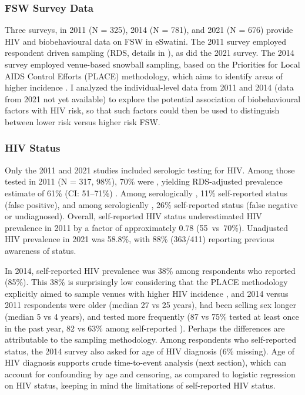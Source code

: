 \subsubsection{FSW Survey Data}\label{model.par.fsw.data}
Three surveys, in
2011 \cite{Baral2014} (N = 325),
2014 \cite{EswKP2014} (N = 781), and
2021 \cite{EswIBBS2022} (N = 676)
provide HIV and biobehavioural data on FSW in eSwatini.
The 2011 survey employed respondent driven sampling (RDS, details in \cite{Yam2013}),
as did the 2021 survey.
The 2014 survey employed venue-based snowball sampling, based on the
Priorities for Local AIDS Control Efforts (PLACE) methodology,
which aims to identify areas of higher incidence \cite{Weir2005}.
I analyzed the individual-level data from 2011 and 2014 (data from 2021 not yet available)
to explore the potential association of biobehavioural factors with HIV risk,
so that such factors could then be used to distinguish between
lower risk versus higher risk FSW.
\subsubsection{HIV Status}\label{model.par.fsw.hiv}
Only the 2011 and 2021 studies included serologic testing for HIV.
Among those tested in 2011 (N = 317, 98\%), 70\% were \hivp,
yielding RDS-adjusted prevalence estimate of 61\% (CI: 51--71\%) \cite{Baral2014}.
Among serologically \hivn, 11\% self-reported \hivp status (false positive), and
among serologically \hivp, 26\% self-reported \hivn status (false negative or undiagnosed).
Overall, self-reported HIV status underestimated HIV prevalence in 2011
by a factor of approximately 0.78 (55~vs~70\%).
Unadjusted HIV prevalence in 2021 was 58.8\%,
with 88\% (363/411) reporting previous awareness of \hivp status.
\par
In 2014, self-reported HIV prevalence was 38\% among respondents who reported (85\%).
This 38\% is surprisingly low considering that
the PLACE methodology explicitly aimed to sample venues
with higher HIV incidence \cite{Weir2005}, and 2014 versus 2011 respondents
were older (median 27 vs 25 years), %
had been selling sex longer (median 5 vs 4 years), %
and tested more frequently (87 vs 75\% tested at least once in the past year, %
82 vs 63\% among self-reported \hivn).
Perhaps the differences are attributable to the sampling methodology.
Among respondents who self-reported \hivp status,
the 2014 survey also asked for age of HIV diagnosis (6\% missing).
Age of HIV diagnosis supports crude time-to-event analysis (next section),
which can account for confounding by age and censoring,
as compared to logistic regression on HIV status,
keeping in mind the limitations of self-reported HIV status.

